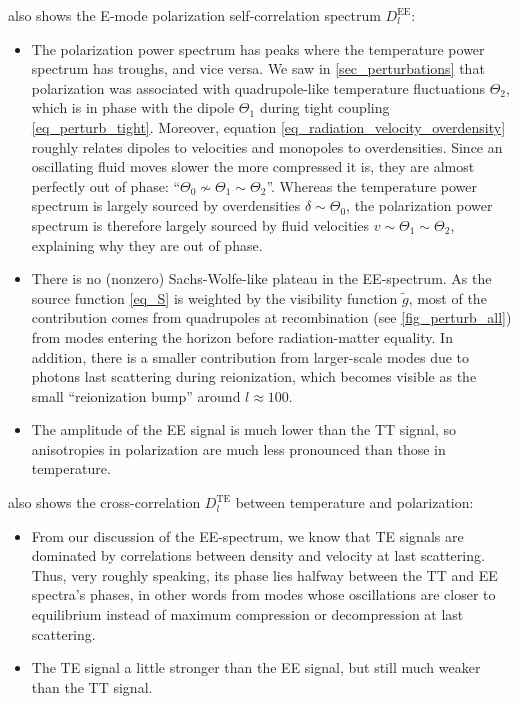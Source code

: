 \documentclass[10pt,a4paper]{article}
\begin{document}
 also shows the E-mode polarization self-correlation spectrum $D_l^\text{EE}$:
\begin{itemize}
\item
The polarization power spectrum has peaks where the temperature power spectrum has troughs, and vice versa.
We saw in \cref{sec_perturbations} that polarization was associated with quadrupole-like temperature fluctuations $\Theta_2$,
which is in phase with the dipole $\Theta_1$ during tight coupling \eqref{eq_perturb_tight}.
Moreover, equation \eqref{eq_radiation_velocity_overdensity} roughly relates dipoles to velocities and monopoles to overdensities.
Since an oscillating fluid moves slower the more compressed it is,
they are almost perfectly out of phase: ``$\Theta_0 \not\sim \Theta_1 \sim \Theta_2$''.
Whereas the temperature power spectrum is largely sourced by overdensities $\delta \sim \Theta_0$,
the polarization power spectrum is therefore largely sourced by fluid velocities $v \sim \Theta_1 \sim \Theta_2$,
explaining why they are out of phase.

\item
There is no (nonzero) Sachs-Wolfe-like plateau in the EE-spectrum.
As the source function \eqref{eq_S} is weighted by the visibility function $\tilde{g}$,
most of the contribution comes from quadrupoles at recombination (see \cref{fig_perturb_all}) from modes entering the horizon before radiation-matter equality.
In addition, there is a smaller contribution from larger-scale modes due to photons last scattering during reionization,
which becomes visible as the small ``reionization bump'' around $l \approx 100$.

\item
The amplitude of the EE signal is much lower than the TT signal,
so anisotropies in polarization are much less pronounced than those in temperature.
\end{itemize}

 also shows the cross-correlation $D_l^\text{TE}$ between temperature and polarization:
\begin{itemize}
\item
From our discussion of the EE-spectrum,
we know that TE signals are dominated by correlations between density and velocity at last scattering.
Thus, very roughly speaking, its phase lies halfway between the TT and EE spectra's phases,
in other words from modes whose oscillations are closer to equilibrium instead of maximum compression or decompression at last scattering.

\item
The TE signal a little stronger than the EE signal,
but still much weaker than the TT signal.
\end{itemize}
\end{document}
